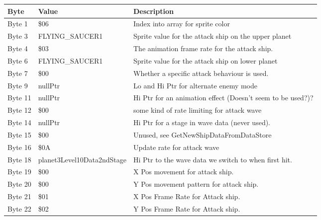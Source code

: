 \begin{figure}[H]
{\begin{adjustbox}{width=12cm}
\begin{tabular}{lll}
\toprule
 Byte    & Value                      & Description                                                        \\
\midrule
 Byte 1  & \$06                        & Index into array for sprite color                                  \\
 Byte 3  & FLYING\_SAUCER1             & Sprite value for the attack ship on the upper planet               \\
 Byte 4  & \$03                        & The animation frame rate for the attack ship.                      \\
 Byte 6  & FLYING\_SAUCER1             & Sprite value for the attack ship on lower planet                   \\
 Byte 7  & \$00                        & Whether a specific attack behaviour is used.                       \\
 Byte 9  & nullPtr                    & Lo and Hi Ptr for alternate enemy mode                             \\
 Byte 11 & nullPtr                    & Hi Ptr for an animation effect (Doesn't seem to be used?)?         \\
 Byte 12 & \$00                        & some kind of rate limiting for attack wave                         \\
 Byte 14 & nullPtr                    & Hi Ptr for a stage in wave data (never used).                      \\
 Byte 15 & \$00                        & Unused, see GetNewShipDataFromDataStore                            \\
 Byte 16 & \$0A                        & Update rate for attack wave                                        \\
 Byte 18 & planet3Level10Data2ndStage & Hi Ptr to the wave data we switch to when first hit.               \\
 Byte 19 & \$00                        & X Pos movement for attack ship.                                    \\
 Byte 20 & \$00                        & Y Pos movement pattern for attack ship.                            \\
 Byte 21 & \$01                        & X Pos Frame Rate for Attack ship.                                  \\
 Byte 22 & \$02                        & Y Pos Frame Rate for Attack ship.                                  \\

\end{tabular}
\end{adjustbox}}
\end{figure}
